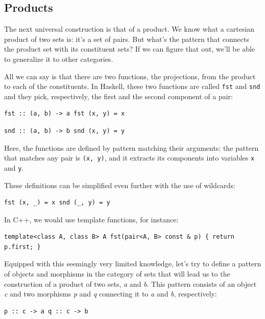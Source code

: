 \subsection{Products}\label{products}

The next universal construction is that of a product. We know what a
cartesian product of two sets is: it's a set of pairs. But what's the
pattern that connects the product set with its constituent sets? If we
can figure that out, we'll be able to generalize it to other categories.

All we can say is that there are two functions, the projections, from
the product to each of the constituents. In Haskell, these two functions
are called \texttt{fst} and \texttt{snd} and they pick, respectively,
the first and the second component of a pair:

\begin{verbatim}
fst :: (a, b) -> a fst (x, y) = x
\end{verbatim}

\begin{verbatim}
snd :: (a, b) -> b snd (x, y) = y
\end{verbatim}

Here, the functions are defined by pattern matching their arguments: the
pattern that matches any pair is \texttt{(x,\ y)}, and it extracts its
components into variables \texttt{x} and \texttt{y}.

These definitions can be simplified even further with the use of
wildcards:

\begin{verbatim}
fst (x, _) = x snd (_, y) = y
\end{verbatim}

In C++, we would use template functions, for instance:

\begin{verbatim}
template<class A, class B> A fst(pair<A, B> const & p) { return p.first; }
\end{verbatim}

Equipped with this seemingly very limited knowledge, let's try to define
a pattern of objects and morphisms in the category of sets that will
lead us to the construction of a product of two sets, \emph{a} and
\emph{b}. This pattern consists of an object \emph{c} and two morphisms
\emph{p} and \emph{q} connecting it to \emph{a} and \emph{b},
respectively:

\begin{verbatim}
p :: c -> a q :: c -> b
\end{verbatim}


